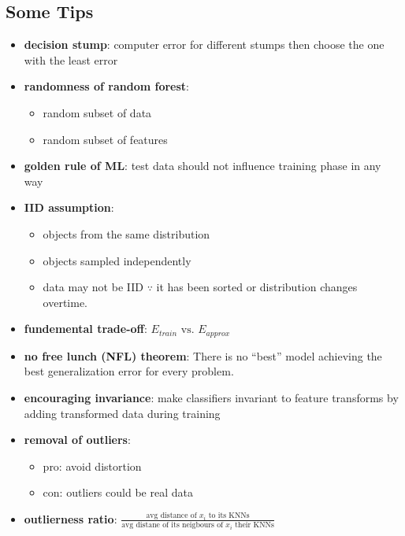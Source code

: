 \documentclass[10pt,landscape,a4paper]{article}
\begin{document}
\begin{multicols*}{5}
\section{Some Tips}
\begin{itemize}
    \item \textbf{decision stump}: computer error for different stumps then choose the one with the least error
    \item \textbf{randomness of random forest}:
    \begin{itemize}
        \item random subset of data
        \item random subset of features
    \end{itemize}
    \item \textbf{golden rule of ML}: test data should not influence training phase in any way
    \item \textbf{IID assumption}:
    \begin{itemize}
        \item objects from the same distribution
        \item objects sampled independently
        \item data may not be IID \(\because \) it has been sorted or distribution changes overtime.
    \end{itemize}
    \item \textbf{fundemental trade-off}: \(E_{train} \text{ vs. } E_{approx}\)
    \item \textbf{no free lunch (NFL) theorem}: There is no ``best'' model achieving the best generalization error for every problem.
    \item \textbf{encouraging invariance}: make classifiers invariant to feature transforms by adding transformed data during training
    \item \textbf{removal of outliers}:
    \begin{itemize}
        \item pro: avoid distortion
        \item con: outliers could be real data
    \end{itemize}
    \item \textbf{outlierness ratio}: \(\frac{\text{avg distance of } x_i \text{ to its KNNs}}{\text{avg distane of its neigbours of } x_i \text{ their KNNs}}\)
\end{itemize}

\end{multicols*}
\end{document}
